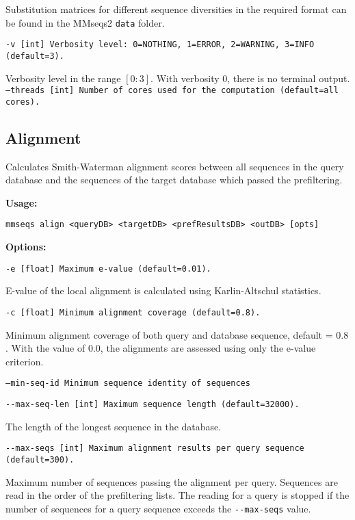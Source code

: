 \documentclass[11pt,a4paper]{scrreprt}
\begin{document}
Substitution matrices for different sequence diversities in the required format can be found in the MMseqs2 \texttt{data} folder.

\texttt{\small -v {[}int{]} Verbosity level: 0=NOTHING, 1=ERROR, 2=WARNING, 3=INFO (default=3).}{\small \par}

Verbosity level in the range $[0:3]$. With verbosity $0$, there is no terminal output.
\texttt{\small --threads {[}int{]} Number of cores used for the computation (default=all cores).}{\small \par}
\subsection{Alignment}
Calculates Smith-Waterman alignment scores between all sequences in the query database and the sequences of the target database which passed the prefiltering.

\textbf{Usage:}

\texttt{mmseqs align <queryDB> <targetDB> <prefResultsDB> <outDB> {[}opts{]}}

\textbf{Options:}

\texttt{\small -e {[}float{]} Maximum e-value (default=0.01).}{\small \par}

E-value of the local alignment is calculated using Karlin-Altschul statistics.

\texttt{\small -c {[}float{]} Minimum alignment coverage (default=0.8).}{\small \par}

Minimum alignment coverage of both query and database sequence, default = $0.8$. With the value of $0.0$, the alignments are assessed using only the e-value criterion.

\texttt{\small --min-seq-id Minimum sequence identity of sequences}{\small \par}

\texttt{\small -{}-max-seq-len {[}int{]} Maximum sequence length (default=32000).}{\small \par}

The length of the longest sequence in the database.

\texttt{\small -{}-max-seqs {[}int{]} Maximum alignment results per query sequence (default=300).}{\small \par}

Maximum number of sequences passing the alignment per query. Sequences are read in the order of the prefiltering lists. The reading for a query is stopped if the number of sequences for a query sequence exceeds the \texttt{-{}-max-seqs} value.
\end{document}
